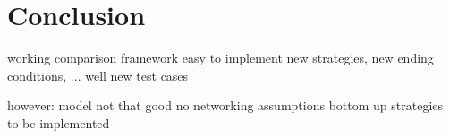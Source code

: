 \chapter{Conclusion}
\label{chap:conclusion}

working comparison framework
easy to implement new strategies, new ending conditions, ...
well new test cases

however:
model not that good
no networking assumptions
bottom up strategies to be implemented
